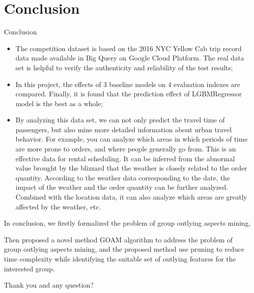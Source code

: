 \documentclass[
 size=14pt,
 paper=smartboard,  %
 mode=present, 		%
 display=slides, 	%
 style=tuliplab,  	%
 pauseslide,
 fleqn,leqno]{powerdot}
\begin{document}


\section{Conclusion}

\begin{slide}{Conclusion}
\begin{itemize}
\item
\smallskip
The competition dataset is based on the 2016 NYC Yellow Cab trip record data made available in Big Query on Google Cloud Platform. The real data set is helpful to verify the authenticity and reliability of the test results;

\item
\smallskip
In this project, the effects of 3 baseline models on 4 evaluation indexes are compared. Finally, it is found that the prediction effect of LGBMRegressor model is the best as a whole;

\item
\smallskip
By analyzing this data set, we can not only predict the travel time of passengers, but also mine more detailed information about urban travel behavior. For example, you can analyze which areas in which periods of time are more prone to orders, and where people generally go from. This is an effective data for rental scheduling. It can be inferred from the abnormal value brought by the blizzard that the weather is closely related to the order quantity. According to the weather data corresponding to the date, the impact of the weather and the order quantity can be further analyzed. Combined with the location data, it can also analyze which areas are greatly affected by the weather, etc.

\end{itemize}



\begin{note}
In conclusion,
we firstly formalized the problem of
group outlying aspects mining,

Then proposed a novel method GOAM algorithm to address the problem of
group outlying aspects mining,
and the proposed method use pruning to reduce time complexity
while identifying the suitable set of outlying features for the interested group.

Thank you and any question?
\end{note}

\end{slide}
\end{document}
